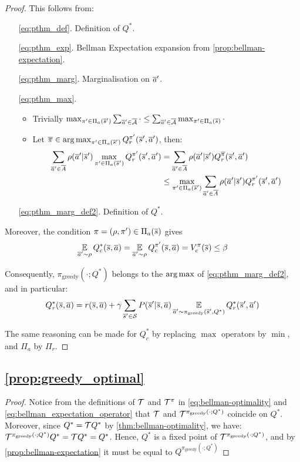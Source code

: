 \begin{subappendices}
\begin{proof}
	This follows from:
	\begin{enumerate}
		\item[\eqref{eq:pthm_def}.] Definition of $Q^*$. 
		\item[\eqref{eq:pthm_exp}.] Bellman Expectation expansion from \autoref{prop:bellman-expectation}.
		\item[\eqref{eq:pthm_marg}.] Marginalisation on $\overline{a}'$.
		\item[\eqref{eq:pthm_max}.] \begin{itemize}
			\item Trivially $\max_{\pi'\in\Pi_a(\overline{s}')} \sum_{\overline{a}'\in\overline{\mathcal{A}}} \cdot \leq \sum_{\overline{a}'\in\overline{\mathcal{A}}} \max_{ \pi'\in\Pi_a(\overline{s})} \cdot$
			\item Let $\overline{\pi}\in\operatorname*{arg\,max}_{\pi'\in\Pi_a(\overline{s}')} Q_r^{\pi'}(\overline{s}', \overline{a}')$, then:
			\begin{align*}
			\sum_{\overline{a}'\in\overline{A}}\rho(\overline{a}'|\overline{s}')\max_{\pi'\in\Pi_a(\overline{s}')}Q_r^{\pi'}(\overline{s}', \overline{a}') &= \sum_{\overline{a}'\in\overline{A}}\rho(\overline{a}'|\overline{s}')Q_r^{\overline{\pi}}(\overline{s}', \overline{a}') \\
			&\leq  \max_{\pi'\in\Pi_a(\overline{s}')} \sum_{\overline{a}'\in\overline{A}}\rho(\overline{a}'|\overline{s}')Q_r^{\pi'}(\overline{s}', \overline{a}')
			\end{align*}
		\end{itemize}
		\item[\eqref{eq:pthm_marg_def2}.] Definition of $Q^*$.
	\end{enumerate}
	
	Moreover, the condition $\pi=(\rho, \pi')\in\Pi_a(\overline{s})$ gives
	\begin{equation*}
	\operatorname*{\mathbb{E}}\limits_{\overline{a}'\sim\rho} Q_c^{*}(\overline{s}, \overline{a}) = \operatorname*{\mathbb{E}}\limits_{\overline{a}'\sim\rho} Q_c^{\pi'}(\overline{s}, \overline{a}) = V_c^{\pi}(\overline{s}) \leq \beta
	\end{equation*}
	
	Consequently, $\pi_\text{greedy}(\cdot; Q^*)$ belongs to the $\operatorname*{arg\,max}$ of \eqref{eq:pthm_marg_def2}, and in particular:
	\begin{equation*}
	Q_r^*(\overline{s}, \overline{a}) = r(\overline{s}, \overline{a}) + \gamma \sum_{\overline{s}'\in\mathcal{S}}  P(\overline{s}' | \overline{s}, \overline{a}) \operatorname*{\mathbb{E}}\limits_{\overline{a}'\sim\pi_\text{greedy}(\overline{s}', Q^*)} Q_r^*(\overline{s}', \overline{a}')
	\end{equation*}
	
	The same reasoning can be made for $Q_c^*$ by replacing $\max$ operators by $\min$, and $\Pi_a$ by $\Pi_r$.
\end{proof}


\subsection{\autoref{prop:greedy_optimal}}
\begin{proof}
	Notice from the definitions of $\mathcal{T}$ and $\mathcal{T}^\pi$ in \eqref{eq:bellman-optimality} and \eqref{eq:bellman_expectation_operator} that $\mathcal{T}$ and $\mathcal{T}^{\pi_\text{greedy}(\cdot;Q^*)}$ coincide on $Q^*$. Moreover, since $Q^* = \mathcal{T} Q^*$ by \autoref{thm:bellman-optimality}, we have: $    \mathcal{T}^{\pi_\text{greedy}(\cdot;Q^*)} Q^* = \mathcal{T} Q^* = Q^*
	$.
	Hence, $Q^*$ is a fixed point of $\mathcal{T}^{\pi_\text{greedy}(\cdot;Q^*)}$, and by \autoref{prop:bellman-expectation} it must be equal to $Q^{\pi_\text{greedy}(\cdot;Q^*)}$
	

\end{proof}
\end{subappendices}
